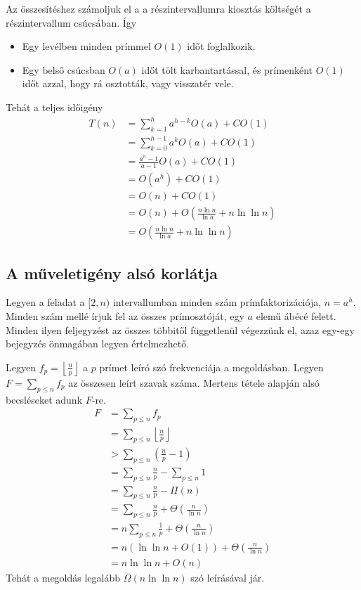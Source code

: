 \documentclass[12pt]{report}
\begin{document}
Az összesítéshez számoljuk el a a részintervallumra kiosztás költségét a részintervallum csúcsában. Így
\begin{itemize}
\item Egy levélben minden prímmel $O(1)$ időt foglalkozik.
\item Egy belső csúcsban $O(a)$ időt tölt karbantartással, és prímenként $O(1)$ időt azzal,
hogy rá osztották, vagy visszatér vele.
\end{itemize}
Tehát a teljes időigény
\begin{align*}
T(n) &= \sum_{k=1}^h a^{h-k} O(a) + C O(1) \\
&= \sum_{k=0}^{h-1} a^k O(a) + C O(1) \\
&= \frac{a^h-1}{a-1} O(a) + C O(1) \\
&= O(a^h) + C O(1) \\
&= O(n) + C O(1) \\
&= O(n) + O \left( \frac{n \ln{n}}{\ln{a}} + n \ln{\ln{n}} \right) \\
&= O \left( \frac{n \ln{n}}{\ln{a}} + n \ln{\ln{n}} \right)
\end{align*}

\subsection{A műveletigény alsó korlátja}

Legyen a feladat a $[2, n)$ intervallumban minden szám prímfaktorizációja,
$n=a^h$.
Minden szám mellé írjuk fel az összes prímosztóját, egy $a$ elemű ábécé felett.
Minden ilyen feljegyzést az összes többitől függetlenül végezzünk el,
azaz egy-egy bejegyzés önmagában legyen értelmezhető.

Legyen $f_p = \left\lfloor \frac{n}{p} \right\rfloor$ a $p$ prímet leíró szó
frekvenciája a megoldásban.
Legyen $F = \sum_{p \le n} f_p$ az összesen leírt szavak száma.
Mertens tétele\cite{mertens} alapján alsó becsléseket adunk $F$-re.
\begin{align*}
F &= \sum_{p \le n} f_p \\
&= \sum_{p \le n} \left\lfloor \frac{n}{p} \right\rfloor \\
&> \sum_{p \le n} \left( \frac{n}{p} - 1 \right) \\
&= \sum_{p \le n} \frac{n}{p} - \sum_{p \le n} 1 \\
&= \sum_{p \le n} \frac{n}{p} - \Pi(n) \\
&= \sum_{p \le n} \frac{n}{p} + \Theta\left(\frac{n}{\ln{n}}\right) \\
&= n \sum_{p \le n} \frac{1}{p} + \Theta\left(\frac{n}{\ln{n}}\right) \\
&= n \left( \ln{\ln{n} + O(1)} \right) + \Theta\left(\frac{n}{\ln{n}}\right) \\
&= n \ln{\ln{n}} + O(n)
\end{align*}
Tehát a megoldás legalább $\Omega(n \ln{\ln{n}})$ szó leírásával jár.
\end{document}
